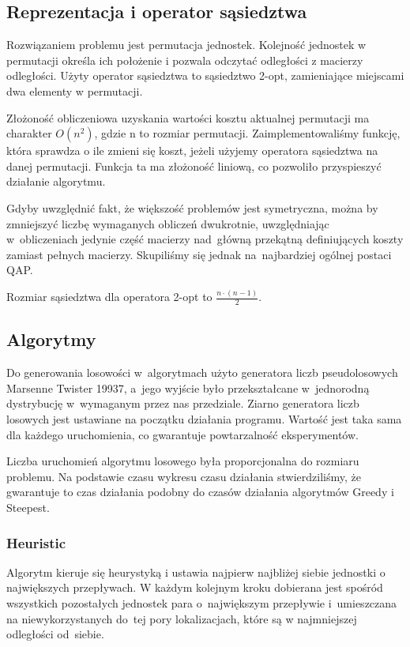 \documentclass[a4paper,10pt]{article}
\begin{document}
\subsection{Reprezentacja i operator sąsiedztwa}
Rozwiązaniem problemu jest permutacja jednostek.
Kolejność jednostek w permutacji określa ich położenie i pozwala odczytać odległości z macierzy odległości.
Użyty operator sąsiedztwa to sąsiedztwo 2-opt, zamieniające miejscami dwa elementy w permutacji.

Złożoność obliczeniowa uzyskania wartości kosztu aktualnej permutacji ma charakter $O(n^2)$, gdzie n to rozmiar permutacji.
Zaimplementowaliśmy funkcję, która sprawdza o ile zmieni się koszt, jeżeli użyjemy operatora sąsiedztwa na danej permutacji.
Funkcja ta ma złożoność liniową, co pozwoliło przyspieszyć działanie algorytmu.

Gdyby uwzględnić fakt, że większość problemów jest symetryczna, można by zmniejszyć liczbę wymaganych obliczeń dwukrotnie,
uwzględniając w~obliczeniach jedynie część macierzy nad~główną przekątną definiujących koszty zamiast pełnych macierzy.
Skupiliśmy się jednak na~najbardziej ogólnej postaci QAP.

Rozmiar sąsiedztwa dla operatora 2-opt to $\frac{n \cdot (n-1)}{2}$.

\subsection{Algorytmy}
Do generowania losowości w~algorytmach użyto generatora liczb pseudolosowych Marsenne Twister 19937,
a~jego wyjście było przekształcane w~jednorodną dystrybucję w~wymaganym przez nas przedziale.
Ziarno generatora liczb losowych jest ustawiane na początku działania programu.
Wartość jest taka sama dla każdego uruchomienia, co gwarantuje powtarzalność eksperymentów.

Liczba uruchomień algorytmu losowego była proporcjonalna do rozmiaru problemu.
Na podstawie czasu wykresu czasu działania stwierdziliśmy, że gwarantuje to czas działania podobny do czasów działania algorytmów Greedy i Steepest.

\subsubsection{Heuristic}
Algorytm kieruje się heurystyką i ustawia najpierw najbliżej siebie jednostki o największych przepływach.
W każdym kolejnym kroku dobierana jest spośród wszystkich pozostałych jednostek para o~największym przepływie
i~umieszczana na niewykorzystanych do~tej pory lokalizacjach, które są w najmniejszej odległości od~siebie.
\end{document}

